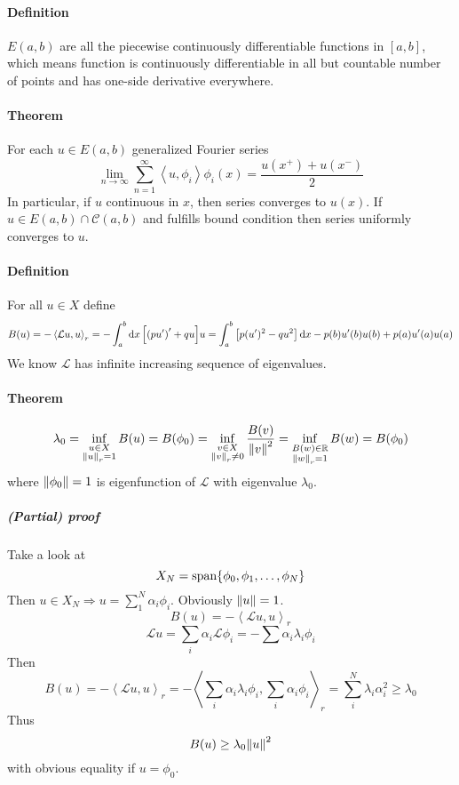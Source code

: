 \paragraph{Definition}
$E(a,b)$ are all the piecewise continuously differentiable  functions in $[a,b]$, which means function is continuously differentiable in all but countable number of points and has one-side derivative everywhere.
\paragraph{Theorem}
For each $u \in E(a,b)$ generalized Fourier series
$$\lim_{n\to \infty} \sum_{n=1}^\infty \left\langle u, \phi_i \right\rangle \phi_i(x) = \frac{u(x^+) + u(x^-)}{2}$$
In particular, if $u$ continuous in $x$, then series converges to $u(x)$. If $u\in E(a,b) \cap \mathcal{C}(a,b)$ and fulfills bound condition then series uniformly converges to $u$. 
\paragraph{Definition}
For all $u\in X$ define
$$B(u) = -\left\langle \mathcal{L}u, u \right\rangle_r = -\int_a^b \dd{x} \qty[\qty(pu')'+ qu]u = \int_a^b \qty[p(u')^2 - qu^2] \dd{x} - p(b)u'(b)u(b) + p(a)u'(a) u(a) $$
We know $\mathcal{L}$ has infinite increasing sequence of eigenvalues.
\paragraph{Theorem}
$$\lambda_0 = \inf\limits_{\substack{u\in X \\  \norm{u}_r=1}} B(u) = B(\phi_0) = \inf\limits_{\substack{v\in X \\  \norm{v}_r\neq0}} \frac{B(v)}{\norm{v}^2}  = \inf\limits_{\substack{B(w)\in \mathbb{R} \\  \norm{w}_r=1}} B(w)  = B(\phi_0)$$
where $\norm{\phi_0}=1$ is eigenfunction of $\mathcal{L}$ with eigenvalue  $\lambda_0$.
\subparagraph{(Partial) proof}
Take a look at
$$X_N = \text{span} \qty{\phi_0, \phi_1, \dots, \phi_N}$$
Then $u\in X_N \Rightarrow u = \sum_1^N \alpha_i \phi_i$. Obviously $\norm{u}=1$.
$$B(u) = -\left\langle \mathcal{L}u, u \right\rangle_r $$
$$\mathcal{L}u = \sum_i \alpha_i \mathcal{L}\phi_i = -\sum \alpha_i \lambda_i \phi_i$$
Then
$$B(u) = -\left\langle \mathcal{L}u, u \right\rangle_r =  -\left\langle \sum_i\alpha_i \lambda_i \phi_i, \sum_i\alpha_i \phi_i \right\rangle_r = \sum_i^N \lambda_i \alpha_i^2  \geq \lambda_0$$
Thus 
$$B(u) \geq \lambda_0 \norm{u}^2$$
with obvious equality if $u=\phi_0$.
